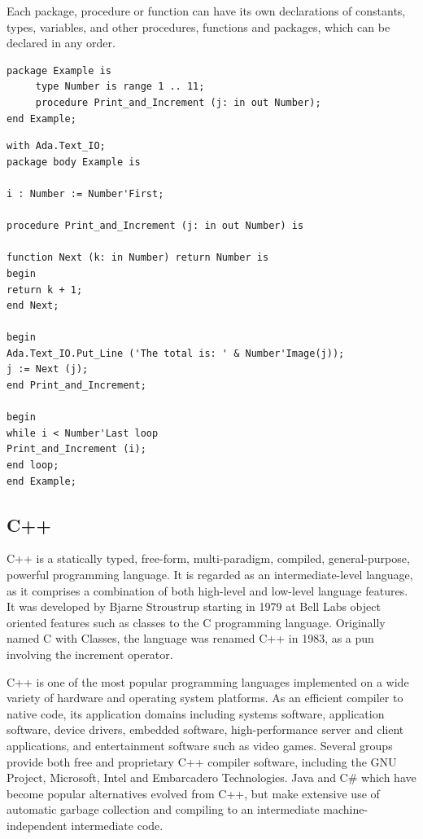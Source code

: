 \documentclass[a4paper,oneside]{report}
\begin{document}
	Each package, procedure or function can have its own declarations of constants, types, variables, and other procedures, functions and packages, which can be declared in any order.

	\begin{lstlisting}[label=Ada Package Specification,caption=Ada Package Specification] 
package Example is
     type Number is range 1 .. 11;
     procedure Print_and_Increment (j: in out Number);
end Example;
	\end{lstlisting}


\begin{lstlisting}[label=Ada Package Implementation,caption=Ada Package Implementation] 
with Ada.Text_IO; 
package body Example is

i : Number := Number'First;

procedure Print_and_Increment (j: in out Number) is

function Next (k: in Number) return Number is
begin
return k + 1;
end Next;

begin
Ada.Text_IO.Put_Line ('The total is: ' & Number'Image(j));
j := Next (j);
end Print_and_Increment;

begin
while i < Number'Last loop
Print_and_Increment (i);
end loop;
end Example;
\end{lstlisting}

	\subsection{C++}

	C++ is a statically typed, free-form, multi-paradigm, compiled, general-purpose, powerful programming language. It is regarded as an intermediate-level language, as it comprises a combination of both high-level and low-level language features. It was developed by Bjarne Stroustrup starting in 1979 at Bell Labs object oriented features such as classes to the C programming language. Originally named C with Classes, the language was renamed C++ in 1983, as a pun involving the increment operator.

 	C++ is one of the most popular programming languages implemented on a wide variety of hardware and operating system platforms. As an efficient compiler to native code, its application domains including systems software, application software, device drivers, embedded software, high-performance server and client applications, and entertainment software such as video games. Several groups provide both free and proprietary C++ compiler software, including the GNU Project, Microsoft, Intel and Embarcadero Technologies. Java and C\# which have become popular alternatives evolved from C++, but make extensive use of automatic garbage collection and compiling to an intermediate machine-independent intermediate code.
	
\end{document}

